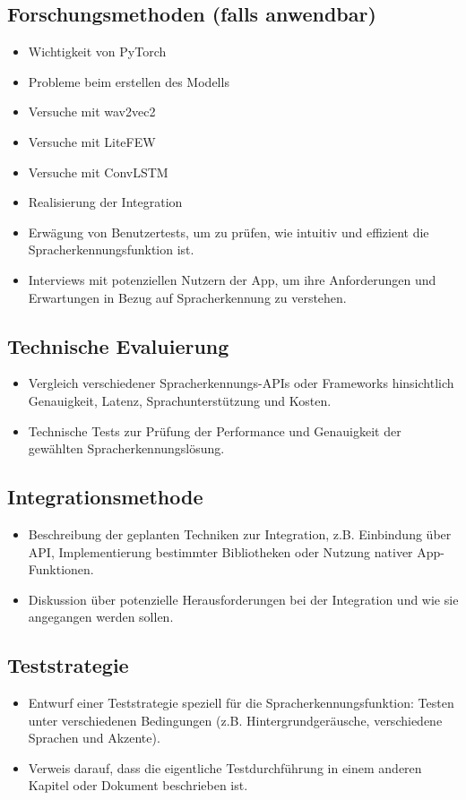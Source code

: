 \documentclass[11pt,a4paper]{article}
\begin{document}
\subsection{Forschungsmethoden (falls anwendbar)}
\begin{itemize}
	\item Wichtigkeit von PyTorch 
	\item Probleme beim erstellen des Modells
	\item Versuche mit wav2vec2
	\item Versuche mit LiteFEW
	\item Versuche mit ConvLSTM
	\item Realisierung der Integration
\end{itemize}
\begin{itemize}
	\item Erwägung von Benutzertests, um zu prüfen, wie intuitiv und effizient die Spracherkennungsfunktion ist.
	\item Interviews mit potenziellen Nutzern der App, um ihre Anforderungen und Erwartungen in Bezug auf Spracherkennung zu verstehen.
\end{itemize}

\subsection{Technische Evaluierung}
\begin{itemize}
	\item Vergleich verschiedener Spracherkennungs-APIs oder Frameworks hinsichtlich Genauigkeit, Latenz, Sprachunterstützung und Kosten.
	\item Technische Tests zur Prüfung der Performance und Genauigkeit der gewählten Spracherkennungslösung.
\end{itemize}

\subsection{Integrationsmethode}
\begin{itemize}
	\item Beschreibung der geplanten Techniken zur Integration, z.B. Einbindung über API, Implementierung bestimmter Bibliotheken oder Nutzung nativer App-Funktionen.
	\item Diskussion über potenzielle Herausforderungen bei der Integration und wie sie angegangen werden sollen.
\end{itemize}

\subsection{Teststrategie}
\begin{itemize}
	\item Entwurf einer Teststrategie speziell für die Spracherkennungsfunktion: Testen unter verschiedenen Bedingungen (z.B. Hintergrundgeräusche, verschiedene Sprachen und Akzente).
	\item Verweis darauf, dass die eigentliche Testdurchführung in einem anderen Kapitel oder Dokument beschrieben ist.
\end{itemize}
\end{document}

